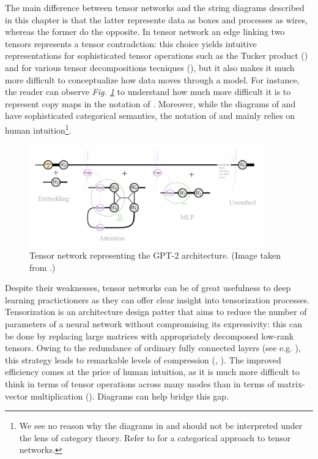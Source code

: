 \documentclass[11pt,a4paper,openright,twoside]{report}
\theoremstyle{plain}
\theoremstyle{definition}
\begin{document}
The main difference between tensor networks and the string diagrams described in this chapter is that the latter represente data as boxes and processes as wires, whereas the former do the opposite. In tensor network an edge linking two tensors represents a tensor contradction: this choice yields intuitive representations for sophisticated tensor operations such as the Tucker product (\cite{xu2023graph}) and for various tensor decompositions tecniques (\cite{taylor2024introduction}), but it also makes it much more difficult to conceptualize how data moves through a model. For instance, the reader can observe \textit{Fig. \ref{fig: gpt2}} to understand how much more difficult it is to represent copy maps in the notation of \cite{taylor2024introduction}. Moreover, while the diagrams of \cite{abbott2023robust} and \cite{khatri2024anatomy} have sophisticated categorical semantics, the notation of \cite{xu2023graph} and \cite{taylor2024introduction} mainly relies on human intuition\footnote{We see no reason why the diagrams in \cite{xu2023graph} and \cite{taylor2024introduction} should not be interpreted under the lens of category theory. Refer to \cite{biamonte2011categorical} for a categorical approach to tensor networks.}.

\begin{figure}[h]
  \begin{center}
    \includegraphics[width=0.9\textwidth]{figures/gpt2diagram.png}
    \caption[GPT-2 architecture]{Tensor network representing the GPT-2 architecture. (Image taken from \cite{taylor2024introduction}.)}
    \label{fig: gpt2}
  \end{center}
\end{figure}

Despite their weaknesses, tensor networks can be of great usefulness to deep learning practictioners as they can offer clear insight into tensorization processes. Tensorization is an architecture design patter that aims to reduce the number of parameters of a neural network without compromising its expressivity: this can be done by replacing large matrices with appropriately decomposed low-rank tensors. Owing to the redundance of ordinary fully connected layers (see e.g. \cite{sainath2013low}), this strategy leads to remarkable levels of compression (\cite{novikov2015tensorizing}, \cite{xu2023graph}). The improved efficiency comes at the price of human intuition, as it is much more difficult to think in terms of tensor operations across many modes than in terms of matrix-vector multiplication (\cite{xu2023graph}). Diagrams can help bridge this gap.
\end{document}

